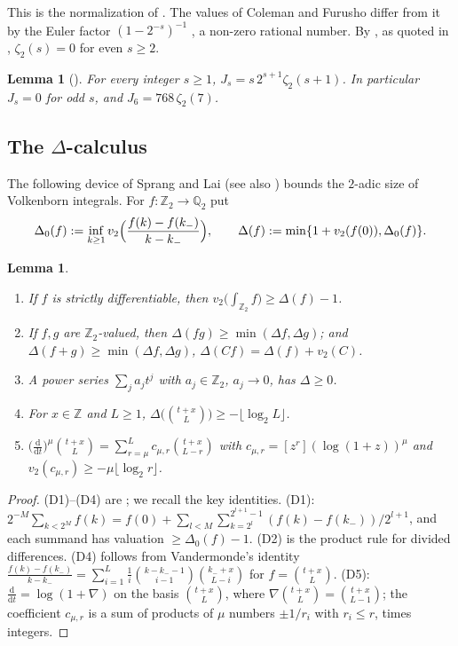\documentclass{amsart}
\newtheorem{lemma}[theorem]{Lemma}
\theoremstyle{definition}
\theoremstyle{remark}
\numberwithin{equation}{section}
\newcommand{\Z}{\mathbb{Z}}
\newcommand{\Q}{\mathbb{Q}}
\begin{document}
This is the normalization of \cite{Lai25,LS25,LSZ26}. The values of Coleman
\cite{Col82} and Furusho \cite{Fur04} differ from it by the Euler factor
$(1-2^{-s})^{-1}$ \cite[\S2.3]{LSZ26}, a non-zero rational number. By
\cite[Lemma~2.4]{Cal05}, as quoted in \cite[\S2.3]{LSZ26}, $\zeta_2(s)=0$ for
even $s\ge2$.

\begin{lemma}[{\cite[Lemma~2.8]{LSZ26}}]\label{lem:LSZ28}
For every integer $s\ge1$, $J_s=s\,2^{s+1}\zeta_2(s+1)$. In particular
$J_s=0$ for odd $s$, and $J_6=768\,\zeta_2(7)$.
\end{lemma}

\subsection{The \texorpdfstring{$\Delta$}{Delta}-calculus}\label{ss:delta}

The following device of Sprang \cite{Spr20} and Lai \cite[Def.~2.3,
Lemmas~2.4--2.5]{Lai25} (see also \cite[Lemmas~2.5--2.6]{LSZ26}) bounds the
$2$-adic size of Volkenborn integrals. For $f\colon\Z_2\to\Q_2$ put
\[
  \Delta_0(f):=\inf_{k\ge1}v_2\Bigl(\frac{f(k)-f(k_-)}{k-k_-}\Bigr),\qquad
  \Delta(f):=\min\{1+v_2(f(0)),\Delta_0(f)\}.
\]

\begin{lemma}\label{lem:delta}
\begin{enumerate}
\item[(D1)] If $f$ is strictly differentiable, then
  $v_2\bigl(\int_{\Z_2}f\bigr)\ge\Delta(f)-1$.
\item[(D2)] If $f,g$ are $\Z_2$-valued, then $\Delta(fg)\ge\min(\Delta f,\Delta g)$;
  and $\Delta(f+g)\ge\min(\Delta f,\Delta g)$, $\Delta(Cf)=\Delta(f)+v_2(C)$.
\item[(D3)] A power series $\sum_ja_jt^j$ with $a_j\in\Z_2$, $a_j\to0$, has
  $\Delta\ge0$.
\item[(D4)] For $x\in\Z$ and $L\ge1$, $\Delta\bigl(\binom{t+x}{L}\bigr)\ge-\lfloor\log_2L\rfloor$.
\item[(D5)] $\bigl(\frac{\mathrm d}{\mathrm dt}\bigr)^\mu\binom{t+x}{L}=\sum_{r=\mu}^{L}c_{\mu,r}\binom{t+x}{L-r}$
  with $c_{\mu,r}=[z^r](\log(1+z))^\mu$ and $v_2(c_{\mu,r})\ge-\mu\lfloor\log_2r\rfloor$.
\end{enumerate}
\end{lemma}

\begin{proof}
(D1)--(D4) are \cite[Lemmas~2.4--2.5]{Lai25}; we recall the key identities.
(D1): $2^{-M}\sum_{k<2^M}f(k)=f(0)+\sum_{l<M}\sum_{k=2^l}^{2^{l+1}-1}(f(k)-f(k_-))/2^{l+1}$,
and each summand has valuation $\ge\Delta_0(f)-1$. (D2) is the product rule
for divided differences. (D4) follows from Vandermonde's identity
$\frac{f(k)-f(k_-)}{k-k_-}=\sum_{i=1}^{L}\frac1i\binom{k-k_--1}{i-1}\binom{k_-+x}{L-i}$
for $f=\binom{t+x}L$. (D5): $\frac{\mathrm d}{\mathrm dt}=\log(1+\nabla)$ on
the basis $\binom{t+x}{L}$, where $\nabla\binom{t+x}L=\binom{t+x}{L-1}$; the
coefficient $c_{\mu,r}$ is a sum of products of $\mu$ numbers $\pm1/r_i$ with
$r_i\le r$, times integers.
\end{proof}
\end{document}
